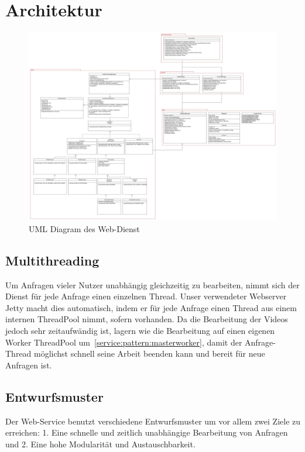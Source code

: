 \section{Architektur}

\begin{figure}[ht]
	\centering
\includegraphics[width=1\textwidth]{./resources/Diagramme/WebService/UMLSERVERPCC.jpg}
\caption{UML Diagram des Web-Dienst}
	\label{service:fig:modules_overview}
\end{figure}

\subsection{Multithreading}
Um Anfragen vieler Nutzer unabhängig gleichzeitig zu bearbeiten, nimmt sich der Dienst für jede Anfrage einen einzelnen Thread. Unser verwendeter Webserver Jetty macht dies automatisch, indem er für jede Anfrage einen Thread aus einem internen ThreadPool nimmt, sofern vorhanden.\newline
Da die Bearbeitung der Videos jedoch sehr zeitaufwändig ist, lagern wie die Bearbeitung auf einen eigenen Worker ThreadPool um~\eqref{service:pattern:masterworker}, damit der Anfrage-Thread möglichst schnell seine Arbeit beenden kann und bereit für neue Anfragen ist. 

\subsection{Entwurfsmuster} \label{service:pattern}
Der Web-Service benutzt verschiedene Entwurfsmuster um vor allem zwei Ziele zu erreichen: 1. Eine schnelle und zeitlich unabhängige Bearbeitung von Anfragen und 2. Eine hohe Modularität und Austauschbarkeit.

